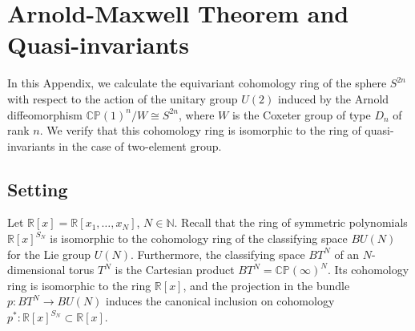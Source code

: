 \documentclass[11pt]{amsart}
\theoremstyle{definition}
\theoremstyle{remark}
\numberwithin{equation}{section}
\newcommand{\la}{\label}
\newcommand{\CP}{\mathbb{CP}}
\begin{document}
\appendix

\section{Arnold-Maxwell Theorem and Quasi-invariants}
\la{ArMapCon}
\begin{center}
\author{M. V. Feigin and K. E. Feldman}
\end{center}

\vspace*{2ex}

    In this Appendix, we calculate the equivariant cohomology ring of the sphere $S^{2n}$ with respect to the action of the unitary group $U(2)$ induced by the Arnold diffeomorphism ${\CP}(1)^n\!/W \cong S^{2n}$, where $W$ is the Coxeter group of type $D_n$ of rank $n$. We verify that this cohomology ring is isomorphic to the ring of quasi-invariants in the case of two-element group.
    


\subsection{Setting}
Let $\mathbb{R}[x]= \mathbb{R}[x_1, \dots ,x_N]$, $N \in \mathbb N$. Recall that the ring of symmetric polynomials $\mathbb{R}[x]^{S_N}$ is isomorphic to the cohomology ring of the classifying space $BU(N)$ for the Lie group $U(N)$. Furthermore, the classifying space $BT^N$ of an $N$-dimensional torus $T^N$ is the Cartesian product $BT^N = {\CP}(\infty)^N$. Its cohomology ring is isomorphic to the ring ${\mathbb R}[x]$, and the projection in the bundle $p\colon BT^N \to BU(N)$ induces the canonical inclusion on cohomology $p^*\colon  {\mathbb R}[x]^{S_N} \subset \mathbb{R}[x]$. 
\end{document}
